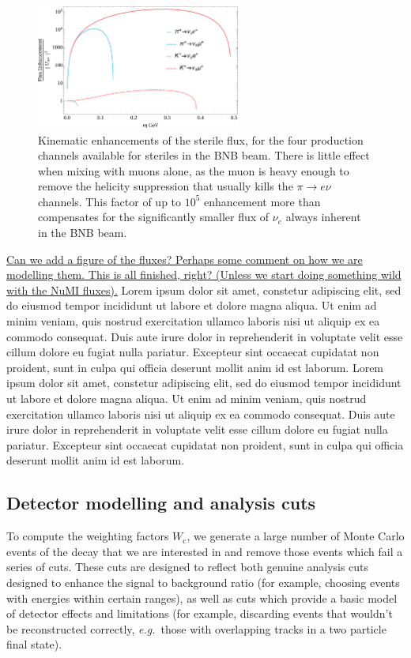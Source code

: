 \documentclass[11pt, a4paper]{article}
\def\eg{\emph{e.g.}}
\newcommand{\lorem}{ \textcolor[rgb]{0.8,0.8,0.8}{Lorem ipsum dolor sit amet, constetur
adipiscing elit, sed do eiusmod tempor incididunt ut labore et dolore magna
aliqua. Ut enim ad minim veniam, quis nostrud exercitation ullamco laboris nisi
ut aliquip ex ea commodo consequat. Duis aute irure dolor in reprehenderit in
voluptate velit esse cillum dolore eu fugiat nulla pariatur. Excepteur sint
occaecat cupidatat non proident, sunt in culpa qui officia deserunt mollit anim
id est laborum.}}
\newcommand{\newtext}[2]{\textcolor{#1}{\ul{#2}}}
\begin{document}
\begin{figure}[t]
\center
\includegraphics[width=0.6\textwidth]{figures/BNB_flux_enhancement.pdf}

\caption{\label{fig:flux_enhancement} Kinematic enhancements of the sterile flux, for the four production channels available for steriles in the BNB beam. There is little effect when mixing with muons alone, as the muon is heavy enough to remove the helicity suppression that usually kills the $\pi\rightarrow e \nu$ channels. This factor of up to $10^5$ enhancement more than compensates for the significantly smaller flux of $\nu_e$ always inherent in the BNB beam.}

\end{figure}



%
\newtext{PB}{Can we add a figure of the fluxes? Perhaps some comment on how we
are modelling them. This is all finished, right? (Unless we start doing
something wild with the NuMI fluxes).}
%
\lorem\lorem 

\subsection{Detector modelling and analysis cuts}

To compute the weighting factors $W_\text{c}$, we generate a large number of
Monte Carlo events of the decay that we are interested in and remove those
events which fail a series of cuts. These cuts are designed to reflect both
genuine analysis cuts designed to enhance the signal to background ratio (for
example, choosing events with energies within certain ranges), as well as cuts
which provide a basic model of detector effects and limitations (for example,
discarding events that wouldn't be reconstructed correctly, \eg\ those with
overlapping tracks in a two particle final state).
\end{document}
